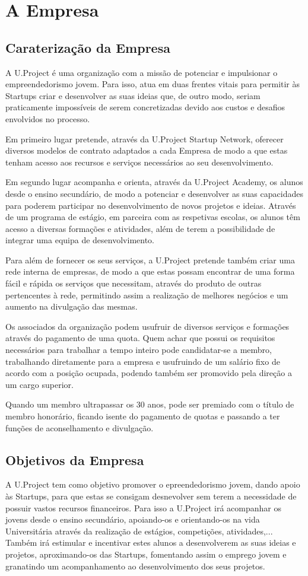 \documentclass[11pt]{report}
\begin{document}
\chapter{A Empresa}

\section{Caraterização da Empresa}
A U.Project é uma organização com a missão de potenciar e impulsionar o empreendedorismo jovem. Para isso, atua em duas frentes vitais para permitir às Startups criar e desenvolver as suas ideias que, de outro modo, seriam praticamente impossíveis de serem concretizadas devido aos custos e desafios envolvidos no processo.

Em primeiro lugar pretende, através da U.Project Startup Network, oferecer diversos modelos de contrato adaptados a cada Empresa de modo a que estas tenham acesso aos recursos e serviços necessários ao seu desenvolvimento.

Em segundo lugar acompanha e orienta, através da U.Project Academy, os alunos desde o ensino secundário, de modo a potenciar e desenvolver as suas capacidades para poderem participar no desenvolvimento de novos projetos e ideias. Através de um programa de estágio, em parceira com as respetivas escolas, os alunos têm acesso a diversas formações e atividades, além de terem a possibilidade de integrar uma equipa de desenvolvimento.

Para além de fornecer os seus serviços, a U.Project pretende também criar uma rede interna de empresas, de modo a que estas possam encontrar de uma forma fácil e rápida os serviços que necessitam, através do produto de outras pertencentes à rede, permitindo assim a realização de melhores negócios e um aumento na divulgação das mesmas.

Os associados da organização podem usufruir de diversos serviços e formações através do pagamento de uma quota. Quem achar que possui os requisitos necessários para trabalhar a tempo inteiro pode candidatar-se a membro, trabalhando diretamente para a empresa e usufruindo de um salário fixo de acordo com a posição ocupada, podendo também ser promovido pela direção a um cargo superior.

Quando um membro ultrapassar os 30 anos, pode ser premiado com o título de membro honorário, ficando isente do pagamento de quotas e passando a ter funções de aconselhamento e divulgação.

\section{Objetivos da Empresa}
A U.Project tem como objetivo promover o epreendedorismo jovem, dando apoio às Startups, para que estas se consigam desnevolver sem terem a necessidade de possuir vastos recursos financeiros.
Para isso a U.Project irá acompanhar os jovens desde o ensino secundário, apoiando-os e orientando-os na vida Universitária através da realização de estágios, competições, atividades,...
Também irá estimular e incentivar estes alunos a desenvolverem as suas ideias e projetos, aproximando-os das Startups, fomentando assim o emprego jovem e granatindo um acompanhamento ao desenvolvimento dos seus projetos.
\end{document}

